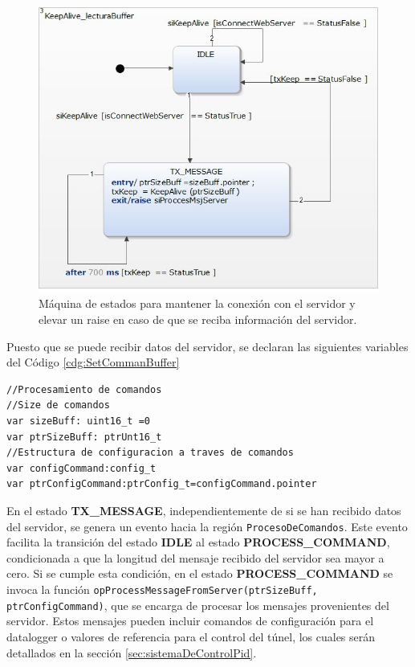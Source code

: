 \begin{figure}[H]
    \centering
    \includegraphics[width=0.6\linewidth]{Figuras/datalogger/Firmware/keepAlive.jpg}
    \caption{Máquina de estados para mantener la conexión con el servidor y elevar un raise en caso de que se reciba información del servidor.}
    \label{fig:keepAlive}
\end{figure}

Puesto que se puede recibir datos del servidor, se declaran las siguientes variables del Código \ref{cdg:SetCommanBuffer}

\begin{lstlisting}[style=yakindustyle, caption={Declaración de variables para validar y procesar la recepción de datos del servidor.}, label=cdg:SetCommanBuffer,basicstyle=\ttfamily\fontsize{8}{8}\selectfont]
//Procesamiento de comandos
//Size de comandos
var sizeBuff: uint16_t =0
var ptrSizeBuff: ptrUnt16_t
//Estructura de configuracion a traves de comandos
var configCommand:config_t
var ptrConfigCommand:ptrConfig_t=configCommand.pointer
\end{lstlisting}

En el estado \textbf{TX\_MESSAGE}, independientemente de si se han recibido datos del servidor, se genera un evento hacia la región \texttt{ProcesoDeComandos}. Este evento facilita la transición del estado \textbf{IDLE} al estado \textbf{PROCESS\_COMMAND}, condicionada a que la longitud del mensaje recibido del servidor sea mayor a cero. Si se cumple esta condición, en el estado \textbf{PROCESS\_COMMAND} se invoca la función \texttt{opProcessMessageFromServer(ptrSizeBuff, ptrConfigCommand)}, que se encarga de procesar los mensajes provenientes del servidor. Estos mensajes pueden incluir comandos de configuración para el datalogger o valores de referencia para el control del túnel, los cuales serán detallados en la sección \ref{sec:sistemaDeControlPid}.

